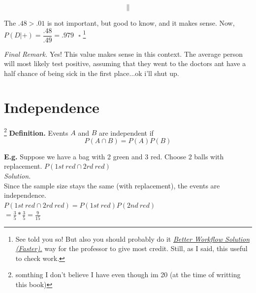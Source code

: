 \documentclass[12pt]{book}
\begin{document}
$$\parallel$$
\begin{center}
\end{center}
The $.48>.01$ is not important, but good to know, and it makes sense. Now,
$P(D|+)=\dfrac{\boxed{.48}}{\mathbf{.49}}=.979~~~\square$
\footnote{See told you so! But also you should probably do it \hyperlink{better workflow solution faster}{\textit{Better Workflow Solution (Faster).}} way for the professor to give most credit. Still, as I said, this useful to check work.}

\noindent \textit{Final Remark. } 
Yes! This value makes sense in this context. The average person will most likely test positive, assuming that they went to the doctors ant have a half chance of being sick in the first place...ok i'll shut up.







\section{Independence}\footnote{somthing I don't believe I have even though im 20 (at the time of writting this book)}
\textbf{Definition. } Events $A$ and $B$ are independent if 
$$\boxed{P(A\cap B)=P(A)P(B)}$$

\noindent \textbf{E.g. } Suppose we have a bag with 2 green and 3 red. Choose 2 balls with replacement. $P(1st~ red \cap 2rd ~red)$\\
\textit{Solution. } \\
Since the sample size stays the same (with replacement), the events are independence.\\
$P(1st~ red \cap 2rd ~red)=P(1st~red)P(2nd~red)$\\
$=\frac{3}{5} * \frac{3}{5}=\frac{9}{15}$\\
\end{document}
